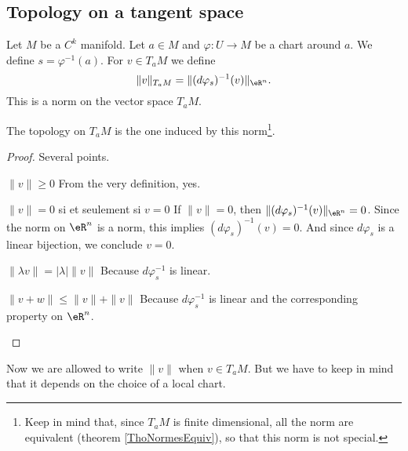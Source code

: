 \subsection{Topology on a tangent space}

\begin{propositionDef}        \label{PROPooHJOXooMGANfd}
    Let \( M\) be a \( C^k\) manifold. Let \( a\in M\) and \( \varphi\colon U\to M\) be a chart around \( a\). We define \( s=\varphi^{-1}(a)\). For \( v\in T_aM\) we define
    \begin{equation}
        \| v \|_{T_aM}=\| (d\varphi_s)^{-1}(v) \|_{\eR^n}.
    \end{equation}
    This is a norm on the vector space \( T_aM\).

    The topology on \( T_aM\) is the one induced by this norm\footnote{Keep in mind that, since \( T_aM\) is finite dimensional, all the norm are equivalent (theorem \ref{ThoNormesEquiv}), so that this norm is not special.}.
\end{propositionDef}

\begin{proof}
    Several points.
    \begin{subproof}
    \item[\( \| v \|\geq 0\)]
        From the very definition, yes.
    \item[\( \| v \|=0\) si et seulement si \( v=0\)]
        If \( \| v \|=0\), then \( \| (d\varphi_s)^{-1}(v) \|_{\eR^n}=0\). Since the norm on \( \eR^n\) is a norm, this implies \( (d\varphi_s)^{-1}(v)=0\). And since \( d\varphi_s\) is a linear bijection, we conclude \( v=0\).
    \item[\( \| \lambda v \|=| \lambda |\| v \|\)]
        Because \( d\varphi_s^{-1}\) is linear.
    \item[\( \| v+w \|\leq \| v \|+\| v \|\)]
        Because \( d\varphi_s^{-1}\) is linear and the corresponding property on \( \eR^n\).
    \end{subproof}
\end{proof}

Now we are allowed to write \( \| v \|\) when \( v\in T_aM\). But we have to keep in mind that it depends on the choice of a local chart.

